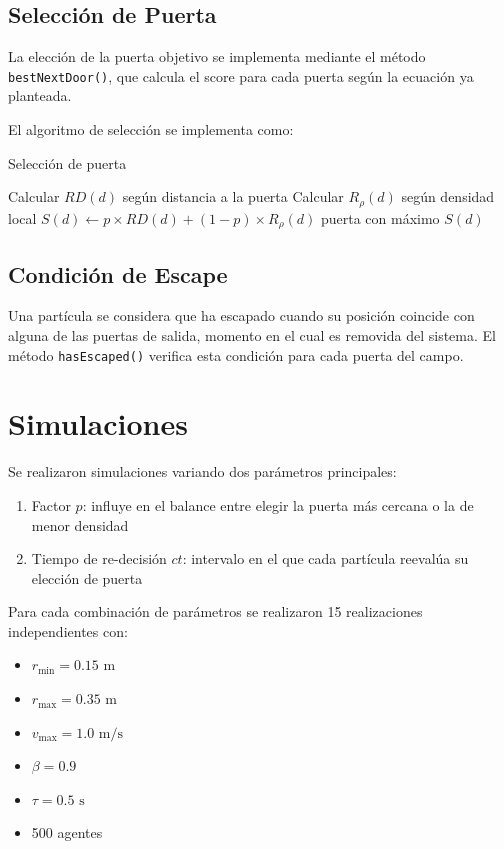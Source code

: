 \documentclass[12pt]{article}
\begin{document}
\subsection{Selección de Puerta}
La elección de la puerta objetivo se implementa mediante el método \texttt{bestNextDoor()}, que calcula el score para cada puerta según la ecuación ya planteada.

El algoritmo de selección se implementa como:

\begin{algorithm}[H]
\caption{Selección de puerta}
\begin{algorithmic}[1]
    \State Calcular $RD(d)$ según distancia a la puerta
    \State Calcular $R_\rho(d)$ según densidad local
    \State $S(d) \leftarrow p \times RD(d) + (1-p) \times R_\rho(d)$
\EndFor
\State \Return puerta con máximo $S(d)$
\end{algorithmic}
\end{algorithm}

\subsection{Condición de Escape}
Una partícula se considera que ha escapado cuando su posición coincide con alguna de las puertas de salida, momento en el cual es removida del sistema. El método \texttt{hasEscaped()} verifica esta condición para cada puerta del campo.

\section{Simulaciones}
Se realizaron simulaciones variando dos parámetros principales:

\begin{enumerate}
    \item Factor $p$: influye en el balance entre elegir la puerta más cercana o la de menor densidad
    \item Tiempo de re-decisión $ct$: intervalo en el que cada partícula reevalúa su elección de puerta
\end{enumerate}

Para cada combinación de parámetros se realizaron 15 realizaciones independientes con:
\begin{itemize}
    \item $r_{\text{min}} = 0.15\text{ m}$
    \item $r_{\text{max}} = 0.35\text{ m}$
    \item $v_{\text{max}} = 1.0\text{ m/s}$
    \item $\beta = 0.9$
    \item $\tau = 0.5\text{ s}$
    \item 500 agentes
\end{itemize}
\end{document}
